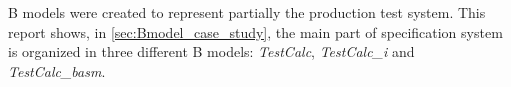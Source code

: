 \documentclass[11pt]{article} %
\begin{document}


B models were created to represent partially the production test system. This
report shows, in \ref{sec:Bmodel_case_study},  the main part of specification
system is organized in three different B models: \textit{TestCalc},
\textit{TestCalc\_i} and \textit{TestCalc\_basm}.







\end{document}

